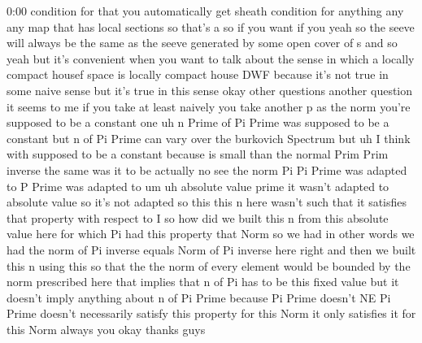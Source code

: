 \begin{unfinished}{0:00}
condition  for  that  you  automatically  get
sheath  condition  for  anything  any  any
map  that  has  local  sections  so  that's  a
so  if  you  want  if  you  yeah  so  the  seeve
will  always  be  the  same  as  the  seeve
generated  by  some  open  cover  of  s  and  so
yeah  but  it's  convenient  when  you  want
to  talk  about  the  sense  in  which  a
locally  compact  housef  space  is  locally
compact  house  DWF  because  it's  not  true
in  some  naive  sense  but  it's  true  in
this
sense  okay  other
questions  another  question  it  seems  to
me  if  you  take  at  least  naively  you  take
another  p  as  the  norm  you're  supposed  to
be  a  constant  one  uh  n  Prime  of  Pi  Prime
was  supposed  to  be  a  constant  but  n  of
Pi  Prime  can  vary  over  the  burkovich
Spectrum  but  uh  I  think
with  supposed  to  be  a  constant  because
is  small  than  the  normal  Prim  Prim
inverse  the  same  was  it  to  be
actually  no  see  the  norm  Pi  Pi  Prime  was
adapted
to  P  Prime  was  adapted  to
um  uh  absolute  value  prime  it  wasn't
adapted  to  absolute  value  so  it's  not
adapted  so  this  this  n  here  wasn't  such
that  it  satisfies  that  property  with
respect
to
I  so  how  did  we  built  this  n  from  this
absolute  value
here  for  which  Pi  had  this  property  that
Norm  so  we  had  in  other  words  we  had  the
norm  of  Pi  inverse  equals  Norm  of  Pi
inverse
here  right  and  then  we  built  this
n  using  this  so  that  the  the  norm  of
every  element  would  be  bounded  by  the
norm  prescribed  here  that  implies  that  n
of  Pi  has  to  be  this  fixed  value  but  it
doesn't  imply  anything  about  n  of  Pi
Prime  because  Pi  Prime  doesn't  NE  Pi
Prime  doesn't  necessarily  satisfy  this
property  for  this  Norm  it  only  satisfies
it  for  this
Norm  always  you
okay  thanks
guys  
\end{unfinished}